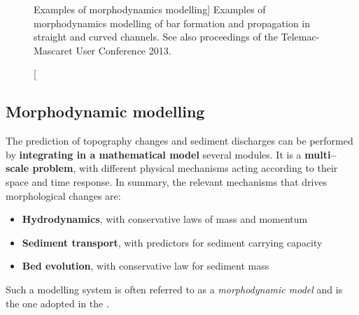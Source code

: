 \begin{figure}[H]%
\begin{center}
%
\hfil
%
%
\hfil
%

%
\hfil
\mbox{}
\end{center}
\caption
[Examples of morphodynamics modelling]
{Examples of morphodynamics modelling of bar formation and propagation in straight and curved channels. See also proceedings of the Telemac-Mascaret User Conference 2013.}
\label{fig:ExampleMultipleImages}
\end{figure}

\subsection{Morphodynamic modelling}
The prediction of topography changes and sediment discharges can be performed by {\bf integrating in a mathematical model}
several modules. It is a {\bf multi--scale problem}, with different physical mechanisms acting according to their space and time response. In summary, the relevant
mechanisms that drives morphological changes are:
\begin{itemize}
         \item {\bf Hydrodynamics}, with conservative laws of mass and momentum 
         \item {\bf Sediment transport}, with predictors for sediment carrying capacity 
         \item {\bf Bed evolution}, with conservative law for sediment mass 
\end{itemize}
\noindent
Such a modelling system is often referred to as a \emph{morphodynamic model} and is the one adopted in the \telemacsystem{}.

